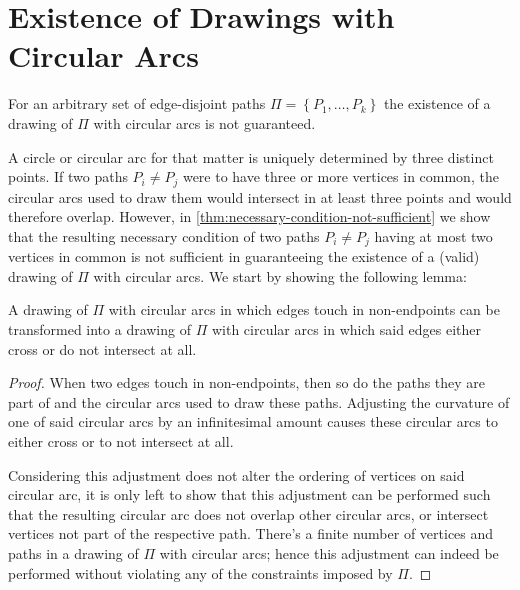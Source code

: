 \section{Existence of Drawings with Circular Arcs}
\label{sect:existence-of-drawings-with-circular-arcs}

For an arbitrary set of edge-disjoint paths ${\Pi = \left\lbrace P_1, \ldots, P_k \right\rbrace}$ the existence of a drawing of ${\Pi}$ with circular arcs is not guaranteed.

A circle \emdash or circular arc for that matter \emdash is uniquely determined by three distinct points. If two paths ${P_i \neq P_j}$ were to have three or more vertices in common, the circular arcs used to draw them would intersect in at least three points and would therefore overlap. However, in \cref{thm:necessary-condition-not-sufficient} we show that the resulting necessary condition of two paths ${P_i \neq P_j}$ having at most two vertices in common is not sufficient in guaranteeing the existence of a (valid) drawing of ${\Pi}$ with circular arcs. We start by showing the following lemma:

\hfill



\begin{lemma}
\label{thm:existence-without-touches}
A drawing of ${\Pi}$ with circular arcs in which edges touch in non-endpoints can be transformed into a drawing of ${\Pi}$ with circular arcs in which said edges either cross or do not intersect at all.
\end{lemma}

\begin{proof}
When two edges touch in non-endpoints, then so do the paths they are part of and the circular arcs used to draw these paths. Adjusting the curvature of one of said circular arcs by an infinitesimal amount causes these circular arcs to either cross or to not intersect at all.

Considering this adjustment does not alter the ordering of vertices on said circular arc, it is only left to show that this adjustment can be performed such that the resulting circular arc does not overlap other circular arcs, or intersect vertices not part of the respective path. There's a finite number of vertices and paths in a drawing of ${\Pi}$ with circular arcs; hence this adjustment can indeed be performed without violating any of the constraints imposed by ${\Pi}$.
\end{proof}





